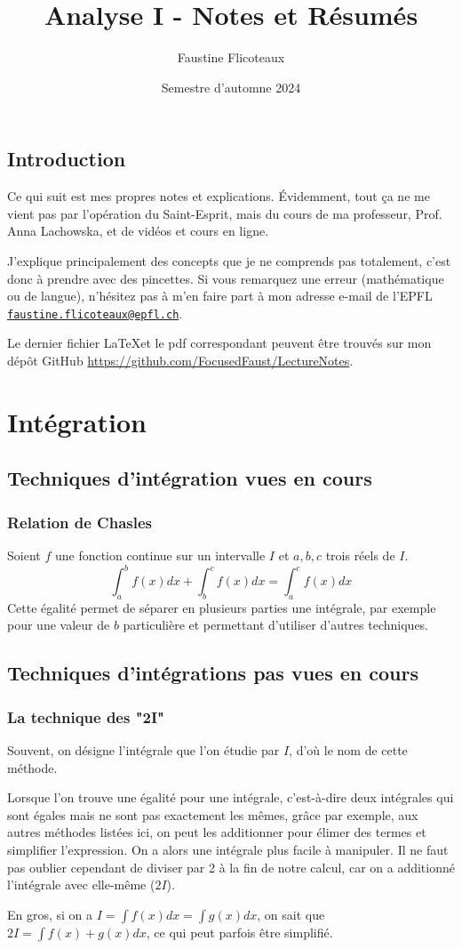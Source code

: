 \documentclass[10pt,a4paper]{book}
\title{Analyse I - Notes et Résumés}
\author{Faustine Flicoteaux}
\date{Semestre d'automne 2024}
\begin{document}
\maketitle
\tableofcontents
\newpage


\section*{Introduction}
Ce qui suit est mes propres notes et explications. Évidemment, tout ça ne me vient pas par l'opération du Saint-Esprit, mais du cours de ma professeur, Prof. Anna Lachowska, et de vidéos et cours en ligne.\par 
J'explique principalement des concepts que je ne comprends pas totalement, c'est donc à prendre avec des pincettes. Si vous remarquez une erreur (mathématique ou de langue), n'hésitez pas à m'en faire part à mon adresse e-mail de l'EPFL \texttt{\href{mailto:faustine.flicoteaux@epfl.ch}{faustine.flicoteaux@epfl.ch}}.\par 
Le dernier fichier \LaTeX et le pdf correspondant peuvent être trouvés sur mon dépôt GitHub \url{https://github.com/FocusedFaust/LectureNotes}.


\chapter{Intégration}
\section{Techniques d'intégration vues en cours}
\subsection{Relation de Chasles}
Soient $f$ une fonction continue sur un intervalle $I$ et $a,b,c$ trois réels de $I$.
\[\int^b_af(x)dx + \int^c_bf(x)dx = \int^c_af(x)dx\]
Cette égalité permet de séparer en plusieurs parties une intégrale, par exemple pour une valeur de $b$ particulière et permettant d'utiliser d'autres techniques.

\section{Techniques d'intégrations pas vues en cours}
\subsection{La technique des "2I"}
Souvent, on désigne l'intégrale que l'on étudie par $I$, d'où le nom de cette méthode.\par 
Lorsque l'on trouve une égalité pour une intégrale, c'est-à-dire deux inté\-grales qui sont égales mais ne sont pas exactement les mêmes, grâce par exemple, aux autres méthodes listées ici, on peut les additionner pour élimer des termes et simplifier l'expression. On a alors une intégrale plus facile à manipuler. Il ne faut pas oublier cependant de diviser par 2 à la fin de notre calcul, car on a additionné l'intégrale avec elle-même ($2I$).\par 
En gros, si on a $I=\int f(x)dx = \int g(x)dx$, on sait que $2I = \int f(x)+g(x)dx$, ce qui peut parfois être simplifié.
\end{document}

